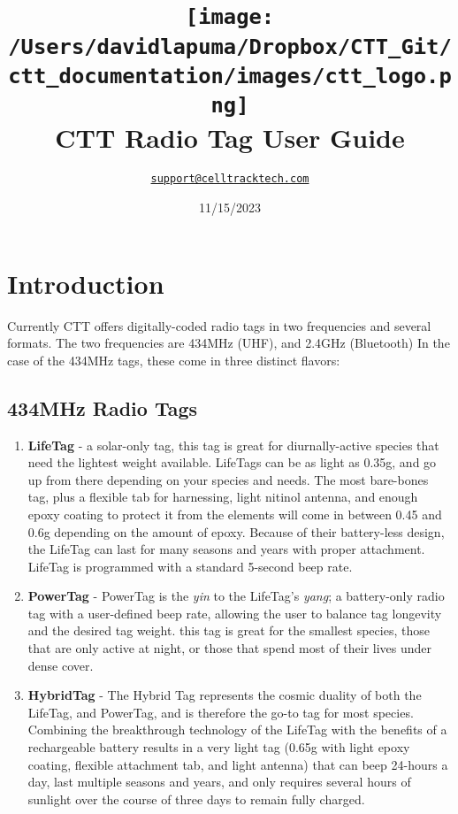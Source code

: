 \documentclass[
]{article}
\title{\texttt{[image: /Users/davidlapuma/Dropbox/CTT\_Git/ctt\_documentation/images/ctt\_logo.png]}\\
CTT Radio Tag User Guide}
\author{\href{mailto:support@celltracktech.com}{\nolinkurl{support@celltracktech.com}}}
\date{11/15/2023}
\begin{document}
\maketitle

{
\setcounter{tocdepth}{2}
\tableofcontents
}
\hypertarget{introduction}{%
\section{Introduction}\label{introduction}}

Currently CTT offers digitally-coded radio tags in two frequencies and
several formats. The two frequencies are 434MHz (UHF), and 2.4GHz
(Bluetooth) In the case of the 434MHz tags, these come in three distinct
flavors:

\hypertarget{mhz-radio-tags}{%
\subsection{434MHz Radio Tags}\label{mhz-radio-tags}}

\begin{enumerate}
\def\labelenumi{\arabic{enumi}.}
\item
  \textbf{LifeTag} - a solar-only tag, this tag is great for
  diurnally-active species that need the lightest weight available.
  LifeTags can be as light as 0.35g, and go up from there depending on
  your species and needs. The most bare-bones tag, plus a flexible tab
  for harnessing, light nitinol antenna, and enough epoxy coating to
  protect it from the elements will come in between 0.45 and 0.6g
  depending on the amount of epoxy. Because of their battery-less
  design, the LifeTag can last for many seasons and years with proper
  attachment. LifeTag is programmed with a standard 5-second beep rate.
\item
  \textbf{PowerTag} - PowerTag is the \emph{yin} to the LifeTag's
  \emph{yang}; a battery-only radio tag with a user-defined beep rate,
  allowing the user to balance tag longevity and the desired tag weight.
  this tag is great for the smallest species, those that are only active
  at night, or those that spend most of their lives under dense cover.
\item
  \textbf{HybridTag} - The Hybrid Tag represents the cosmic duality of
  both the LifeTag, and PowerTag, and is therefore the go-to tag for
  most species. Combining the breakthrough technology of the LifeTag
  with the benefits of a rechargeable battery results in a very light
  tag (0.65g with light epoxy coating, flexible attachment tab, and
  light antenna) that can beep 24-hours a day, last multiple seasons and
  years, and only requires several hours of sunlight over the course of
  three days to remain fully charged.
\end{enumerate}
\end{document}
